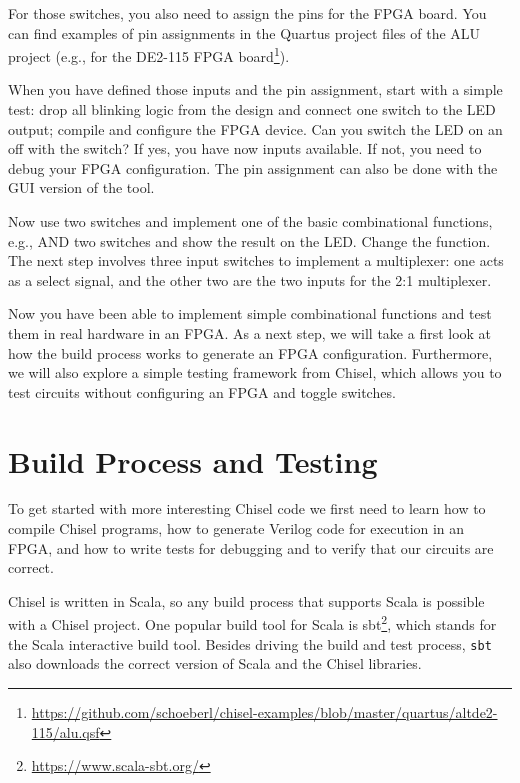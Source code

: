 \documentclass[%
    10pt,
    headinclude, footexclude,
    openright, %
    notitlepage,
    cleardoubleempty,
    headsepline,
    pointlessnumbers,
    bibtotoc, idxtotoc,
    ]{scrbook}
\newcommand{\code}[1]{{\lstinline[basicstyle=\small\ttfamily]{#1}}}
\newcommand{\myref}[2]{\href{#1}{#2}}
\renewcommand{\myref}[2]{{#2}{\footnote{\url{#1}}}}
\begin{document}

\noindent For those switches, you also need to assign the pins for the FPGA board.
You can find examples of pin assignments in the Quartus project files of the ALU project
(e.g., for the \myref{https://github.com/schoeberl/chisel-examples/blob/master/quartus/altde2-115/alu.qsf}{DE2-115
FPGA board}).

When you have defined those inputs and the pin assignment, start with a simple test:
drop all blinking logic from the design and connect one switch to the LED output;
compile and configure the FPGA device. Can you switch the LED on an off with the switch?
If yes, you have now inputs available. If not, you need to debug your FPGA configuration.
The pin assignment can also be done with the GUI version of the tool.

Now use two switches and implement one of the basic combinational functions,
e.g., AND two switches and show the result on the LED. Change the function.
The next step involves three input switches to implement a multiplexer: one acts as
a select signal, and the other two are the two inputs for the 2:1 multiplexer.

Now you have been able to implement simple combinational functions and test them
in real hardware in an FPGA. As a next step, we will take a first look at how the build
process works to generate an FPGA configuration. Furthermore, we will also
explore a simple testing framework from Chisel, which allows you to test circuits
without configuring an FPGA and toggle switches.

\chapter{Build Process and Testing}
\label{chap:build:test}

To get started with more interesting Chisel code we first need to learn how to compile
Chisel programs, how to generate Verilog code for execution in an FPGA,
and how to write tests for debugging and to verify that our circuits are correct.

Chisel is written in Scala, so any build process that supports Scala is possible
with a Chisel project. One popular build tool for Scala is \myref{https://www.scala-sbt.org/}{sbt},
which stands for the Scala interactive build tool.
Besides driving the build and test process, \code{sbt} also downloads the correct
version of Scala and the Chisel libraries.
\end{document}
